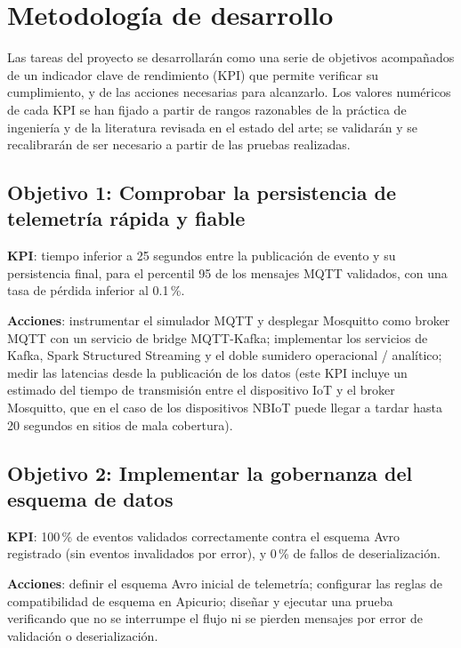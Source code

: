 \section{Metodología de desarrollo}
\label{chap:objetivos}

Las tareas del proyecto se desarrollarán como una serie de objetivos acompañados de un indicador clave de rendimiento (KPI) que permite verificar su cumplimiento, y de las acciones necesarias para alcanzarlo. Los valores numéricos de cada KPI se han fijado a partir de rangos razonables de la práctica de ingeniería y de la literatura revisada en el estado del arte; se validarán y se recalibrarán de ser necesario a partir de las pruebas realizadas.

\subsection{Objetivo 1: Comprobar la persistencia de telemetría rápida y fiable}

\textbf{KPI}: tiempo inferior a 25 segundos entre la publicación de evento y su persistencia final, para el percentil 95 de los mensajes MQTT validados, con una tasa de pérdida inferior al 0.1\,\%.

\textbf{Acciones}: instrumentar el simulador MQTT y desplegar Mosquitto como broker MQTT con un servicio de bridge MQTT-Kafka; implementar los servicios de Kafka, Spark Structured Streaming y el doble sumidero operacional / analítico; medir las latencias desde la publicación de los datos (este KPI incluye un estimado del tiempo de transmisión entre el dispositivo IoT y el broker Mosquitto, que en el caso de los dispositivos NBIoT puede llegar a tardar hasta 20 segundos en sitios de mala cobertura).

\subsection{Objetivo 2: Implementar la gobernanza del esquema de datos}

\textbf{KPI}: 100\,\% de eventos validados correctamente contra el esquema Avro registrado (sin eventos invalidados por error), y 0\,\% de fallos de deserialización.

\textbf{Acciones}: definir el esquema Avro inicial de telemetría; configurar las reglas de compatibilidad de esquema en Apicurio; diseñar y ejecutar una prueba verificando que no se interrumpe el flujo ni se pierden mensajes por error de validación o deserialización.

